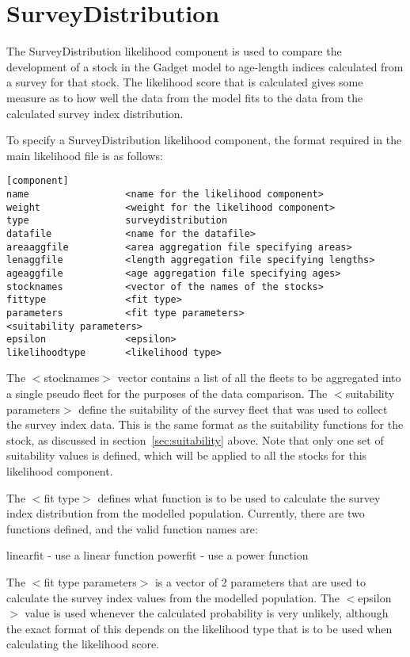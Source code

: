 \documentclass[10pt,twoside]{book}
\begin{document}
\section{SurveyDistribution}\label{sec:surveydistribution}
The SurveyDistribution likelihood component is used to compare the development of a stock in the Gadget model to age-length indices calculated from a survey for that stock.  The likelihood score that is calculated gives some measure as to how well the data from the model fits to the data from the calculated survey index distribution.

\bigskip
To specify a SurveyDistribution likelihood component, the format required in the main likelihood file is as follows:

{\small\begin{verbatim}
[component]
name                 <name for the likelihood component>
weight               <weight for the likelihood component>
type                 surveydistribution
datafile             <name for the datafile>
areaaggfile          <area aggregation file specifying areas>
lenaggfile           <length aggregation file specifying lengths>
ageaggfile           <age aggregation file specifying ages>
stocknames           <vector of the names of the stocks>
fittype              <fit type>
parameters           <fit type parameters>
<suitability parameters>
epsilon              <epsilon>
likelihoodtype       <likelihood type>
\end{verbatim}}

The $<$stocknames$>$ vector contains a list of all the fleets to be aggregated into a single pseudo fleet for the purposes of the data comparison.  The $<$suitability parameters$>$ define the suitability of the survey fleet that was used to collect the survey index data.  This is the same format as the suitability functions for the stock, as discussed in section~\ref{sec:suitability} above.  Note that only one set of suitability values is defined, which will be applied to all the stocks for this likelihood component.

\bigskip
The $<$fit type$>$ defines what function is to be used to calculate the survey index distribution from the modelled population.  Currently, there are two functions defined, and the valid function names are:

\bigskip
linearfit - use a linear function\newline
powerfit - use a power function

\bigskip
The $<$fit type parameters$>$ is a vector of 2 parameters that are used to calculate the survey index values from the modelled population.  The $<$epsilon$>$ value is used whenever the calculated probability is very unlikely, although the exact format of this depends on the likelihood type that is to be used when calculating the likelihood score.
\end{document}
